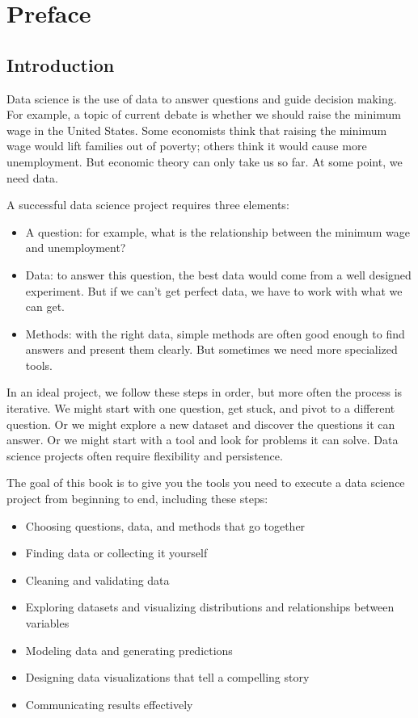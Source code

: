 \chapter{Preface}

\section*{Introduction}

Data science is the use of data to answer questions and guide decision
making. For example, a topic of current debate is whether we should
raise the minimum wage in the United States. Some economists think that
raising the minimum wage would lift families out of poverty; others
think it would cause more unemployment. But economic theory can only
take us so far. At some point, we need data.

A successful data science project requires three elements:

\begin{itemize}
\item
  A question: for example, what is the relationship between the minimum
  wage and unemployment?
\item
  Data: to answer this question, the best data would come from a
  well designed experiment. But if we can't get perfect data, we have to
  work with what we can get.
\item
  Methods: with the right data, simple methods are often good enough to find
  answers and present them clearly. But sometimes we need more
  specialized tools.
\end{itemize}

In an ideal project, we follow these steps in order, but more often the process is iterative.
We might start with one question, get stuck, and pivot to a different question. Or we might explore a new dataset and discover the questions it can answer.
Or we might start with a tool and look for problems it can solve.
Data science projects often require flexibility and persistence.

The goal of this book is to give you the tools you need to execute a data science project from beginning to end, including these steps:

\begin{itemize}
\item
  Choosing questions, data, and methods that go together
\item
  Finding data or collecting it yourself
\item
  Cleaning and validating data
\item
  Exploring datasets and visualizing distributions and relationships between variables
\item
  Modeling data and generating predictions
\item
  Designing data visualizations that tell a compelling story
\item
  Communicating results effectively
\end{itemize}

